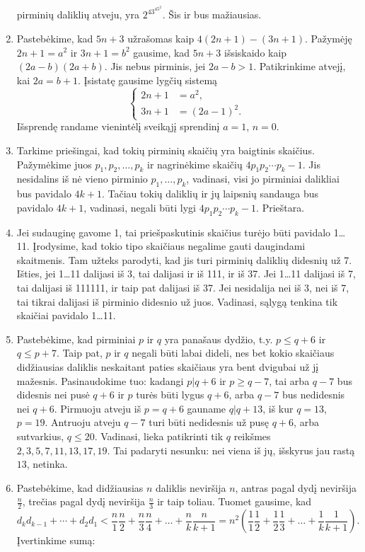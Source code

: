 \begin{enumerate}
    pirminių daliklių atveju, yra $2^43^45^2$. Šis ir bus mažiausias.
\item
    Pastebėkime, kad $5n+3$ užrašomas kaip $4(2n + 1) - (3n+1)$. Pažymėję
    $2n+1 = a^2$ ir $3n+1 = b^2$ gausime, kad $5n+3$ išsiskaido kaip
    $(2a-b)(2a+b)$. Jis nebus pirminis, jei $2a-b >1$. Patikrinkime
    atvejį, kai $2a = b+1$. Įsistatę gausime lygčių sistemą
    $$\begin{cases}
      2n+1 & = a^2, \\
      3n+1 & = (2a-1)^2.
      \end{cases}$$ 
    Išsprendę randame vienintėlį sveikąjį sprendinį $a=1$, $n=0$.
\item
    Tarkime priešingai, kad tokių pirminių skaičių yra baigtinis skaičius.
    Pažymėkime juos $p_1, p_2, \ldots, p_k$ ir nagrinėkime skaičių $4p_1p_2\cdots
    p_k - 1$. Jis nesidalins iš nė vieno pirminio $p_1, \ldots, p_k$,
    vadinasi, visi jo pirminiai dalikliai bus pavidalo $4k+1$. Tačiau tokių
    daliklių ir jų laipsnių sandauga bus pavidalo $4k+1$, vadinasi, negali
    būti lygi $4p_1p_2\cdots p_k - 1$. Prieštara.
\item
    Jei sudauginę gavome 1, tai priešpaskutinis skaičius turėjo būti
    pavidalo 1\dots11.  Įrodysime, kad tokio tipo skaičiaus negalime gauti
    daugindami skaitmenis. Tam užteks parodyti, kad jis turi pirminių
    daliklių didesnių už 7. Išties, jei 1\dots11 dalijasi iš 3, tai
    dalijasi ir iš 111, ir iš 37. Jei 1\dots11 dalijasi iš 7, tai dalijasi
    iš 111111, ir taip pat dalijasi iš 37. Jei nesidalija nei iš 3, nei iš
    7, tai tikrai dalijasi iš pirminio didesnio už juos. Vadinasi, sąlygą
    tenkina tik skaičiai pavidalo 1\dots11.
\item
    Pastebėkime, kad pirminiai $p$ ir $q$ yra panašaus dydžio, t.y.
    $p\leq q+6$ ir $q\leq p+7$. Taip pat, $p$ ir $q$ negali būti labai
    dideli, nes bet kokio skaičiaus didžiausias daliklis neskaitant paties
    skaičiaus yra bent dvigubai už jį mažesnis. Pasinaudokime tuo: kadangi $p|q+6$ ir
    $p\geq q-7$, tai arba $q-7$ bus didesnis nei pusė $q+6$ ir $p$ turės
    būti lygus $q+6$, arba $q-7$ bus nedidesnis nei $q+6$. Pirmuoju atveju
    iš $p=q+6$ gauname $q|q+13$, iš kur $q=13$, $p=19$. Antruoju atveju
    $q-7$ turi būti nedidesnis už pusę $q+6$, arba sutvarkius, $q\leq 20$.
    Vadinasi, lieka patikrinti tik $q$ reikšmes $2,3,5,7,11,13,17,19$. Tai
    padaryti nesunku: nei viena iš jų, išskyrus jau rastą $13$, netinka.
\item
    Pastebėkime, kad didžiausias $n$ daliklis neviršija $n$, antras pagal
    dydį neviršija $\frac{n}{2}$, trečias pagal dydį neviršija
    $\frac{n}{3}$ ir taip toliau. Tuomet gausime, kad $$d_k d_{k-1} +
    \cdots + d_{2}d_{1} < \frac{n}{1}\frac{n}{2} + \frac{n}{3}\frac{n}{4}
    + \dots + \frac{n}{k}\frac{n}{k+1} = n^2(\frac{1}{1}\frac{1}{2} +
    \frac{1}{2}\frac{1}{3} + \dots + \frac{1}{k}\frac{1}{k+1}).$$
    Įvertinkime sumą:
    

\end{enumerate}
